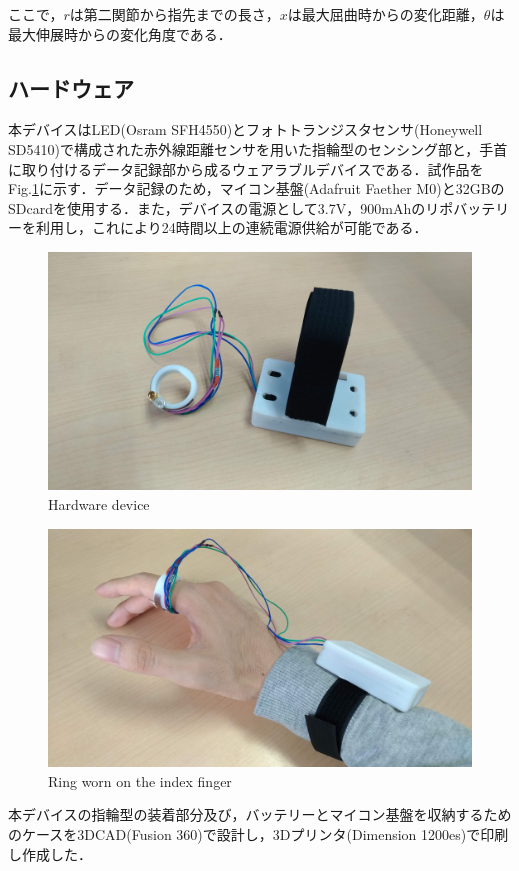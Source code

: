 \documentclass{jarticle}
\begin{document}
ここで，$r$は第二関節から指先までの長さ，$x$は最大屈曲時からの変化距離，$\theta$は最大伸展時からの変化角度である．

\subsection{ハードウェア}
本デバイスはLED(Osram SFH4550)とフォトトランジスタセンサ(Honeywell SD5410)で構成された赤外線距離センサを用いた指輪型のセンシング部と，手首に取り付けるデータ記録部から成るウェアラブルデバイスである．試作品をFig.\ref{fig:fal1}に示す．データ記録のため，マイコン基盤(Adafruit Faether M0)と32GBのSDcardを使用する．また，デバイスの電源として3.7V，900mAhのリポバッテリーを利用し，これにより24時間以上の連続電源供給が可能である．

\begin{figure}[h]
  \centering
  \includegraphics[width=0.8\linewidth]{fig/fal1}
  \caption{Hardware device}
  \label{fig:fal1}
\end{figure}

\begin{figure}[h]
  \centering
  \includegraphics[width=0.8\linewidth]{fig/fal2}
  \caption{Ring worn on the index finger}
  \label{fig:gesture}
\end{figure}

本デバイスの指輪型の装着部分及び，バッテリーとマイコン基盤を収納するためのケースを3DCAD(Fusion 360)で設計し，3Dプリンタ(Dimension 1200es)で印刷し作成した．
\end{document}
